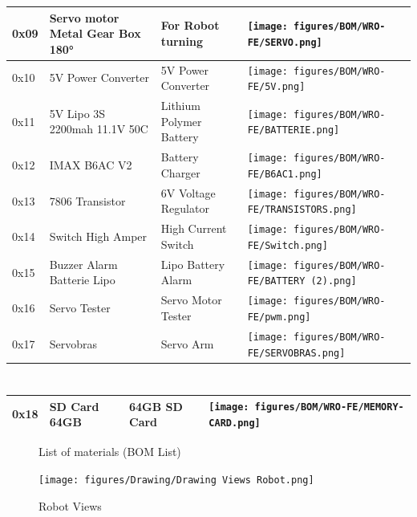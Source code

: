 \documentclass[12pt,a4paper]{article}
\begin{document}
\begin{tabularx}{\textwidth}{|l|X|X|X|}

\hline

0x09 & Servo motor Metal Gear Box 180° & For Robot turning & 
\texttt{[image: figures/BOM/WRO-FE/SERVO.png]} \\
\hline
0x10 & 5V Power Converter & 5V Power Converter & 
\texttt{[image: figures/BOM/WRO-FE/5V.png]} \\
\hline
0x11 & 5V Lipo 3S 2200mah 11.1V 50C & Lithium Polymer Battery & 
\texttt{[image: figures/BOM/WRO-FE/BATTERIE.png]} \\
\hline
0x12 & IMAX B6AC V2 & Battery Charger & 
\texttt{[image: figures/BOM/WRO-FE/B6AC1.png]} \\
\hline
0x13 & 7806 Transistor & 6V Voltage Regulator & 
\texttt{[image: figures/BOM/WRO-FE/TRANSISTORS.png]} \\
\hline
0x14 & Switch High Amper & High Current Switch & 
\texttt{[image: figures/BOM/WRO-FE/Switch.png]} \\
\hline
0x15 & 	Buzzer Alarm Batterie Lipo & Lipo Battery Alarm	 & 
\texttt{[image: figures/BOM/WRO-FE/BATTERY (2).png]} \\
\hline

0x16 & Servo Tester & Servo Motor Tester & 
\texttt{[image: figures/BOM/WRO-FE/pwm.png]} \\
\hline
0x17 & 	Servobras & Servo Arm & 
\texttt{[image: figures/BOM/WRO-FE/SERVOBRAS.png]} \\
\hline
\end{tabularx}


\newpage

\section*{}

\begin{tabularx}{\textwidth}{|l|X|X|X|}
\hline
0x18 & SD Card 64GB & 64GB SD Card & 
\texttt{[image: figures/BOM/WRO-FE/MEMORY-CARD.png]} \\
\hline
\end{tabularx}

\begin{figure}[H]
    \centering
    \caption{List of materials (BOM List)}
    \label{fig:bom}
\end{figure}

\newpage

\begin{figure}[H]
    \vspace{4cm}
    \centering
    \texttt{[image: figures/Drawing/Drawing Views Robot.png]}
    \caption{Robot Views}
\end{figure}
\end{document}
